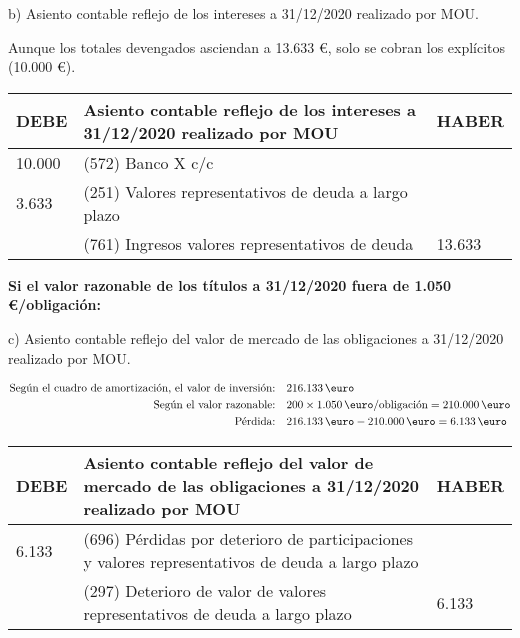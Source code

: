 b) Asiento contable reflejo de los intereses a 31/12/2020 realizado por MOU.

Aunque los totales devengados asciendan a 13.633 \euro, solo se cobran los explícitos (10.000 \euro).


\begin{table}[H]
    \centering
    \begin{tabular}{|p{3cm}|p{6cm}|p{3cm}|}
    \hline
    \rowcolor{blue!30}
    \textbf{DEBE} & \textbf{Asiento contable reflejo de los intereses a 31/12/2020 realizado por MOU} & \textbf{HABER} \\
    \hline
    10.000 & (572) Banco X c/c & \\
    \hline
    3.633 & (251) Valores representativos de deuda a largo plazo & \\
    \hline
    & (761) Ingresos valores representativos de deuda & 13.633 \\
    \hline
    \end{tabular}
\end{table}

\textbf{Si el valor razonable de los títulos a 31/12/2020 fuera de 1.050 €/obligación:}

c) Asiento contable reflejo del valor de mercado de las obligaciones a 31/12/2020 realizado por MOU.



\begin{align*}
    \text{Según el cuadro de amortización, el valor de inversión:} & \quad 216.133 \, \text{\euro} \\
    \text{Según el valor razonable:} & \quad 200 \times 1.050 \, \text{\euro/obligación} = 210.000 \, \text{\euro} \\
    \text{Pérdida:} & \quad 216.133 \, \text{\euro} - 210.000 \, \text{\euro} = 6.133 \, \text{\euro}
\end{align*}

\begin{table}[H]
    \centering
    \begin{tabular}{|p{3cm}|p{6cm}|p{3cm}|}
    \hline
    \rowcolor{blue!30}
    \textbf{DEBE} & \textbf{Asiento contable reflejo del valor de mercado de las obligaciones a 31/12/2020 realizado por MOU} & \textbf{HABER} \\
    \hline
    6.133 & (696) Pérdidas por deterioro de participaciones y valores representativos de deuda a largo plazo & \\
    \hline
    & (297) Deterioro de valor de valores representativos de deuda a largo plazo & 6.133 \\
    \hline
    \end{tabular}
\end{table}

